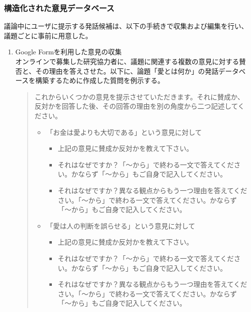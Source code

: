 \documentclass[11pt, a4paper]{jreport} %
\begin{document}
\subsubsection*{構造化された意見データベース}
議論中にユーザに提示する発話候補は、以下の手続きで収集および編集を行い、議題ごとに事前に用意した。
\begin{enumerate}
\item Google Formを利用した意見の収集\\
オンラインで募集した研究協力者に、議題に関連する複数の意見に対する賛否と、その理由を答えさせた。以下に、論題「愛とは何か」の発話データベースを構築するために作成した質問を例示する。
\begin{quote}
これからいくつかの意見を提示させていただきます。それに賛成か、反対かを回答した後、その回答の理由を別の角度から二つ記述してください。
\begin{itemize}
\item 「お金は愛よりも大切である」という意見に対して
\begin{itemize}
\item 上記の意見に賛成か反対かを教えて下さい。
\item それはなぜですか？「〜から」で終わる一文で答えてください。かならず「〜から」もご自身で記入してください。
\item それはなぜですか？異なる観点からもう一つ理由を答えてください。「〜から」で終わる一文で答えてください。かならず「〜から」もご自身で記入してください。
\end{itemize}

\item 「愛は人の判断を誤らせる」という意見に対して
\begin{itemize}
\item 上記の意見に賛成か反対かを教えて下さい。
\item それはなぜですか？「〜から」で終わる一文で答えてください。かならず「〜から」もご自身で記入してください。
\item それはなぜですか？異なる観点からもう一つ理由を答えてください。「〜から」で終わる一文で答えてください。かならず「〜から」もご自身で記入してください。
\end{itemize}
\end{itemize}
\end{quote}


\end{enumerate}
\end{document}
